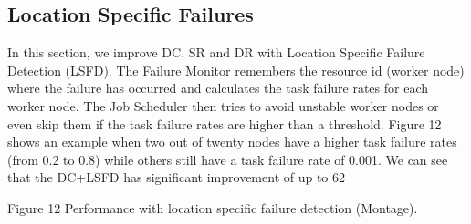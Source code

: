 \documentclass{IOS-Book-Article}
\begin{document}
\subsection{Location Specific Failures }
In this section, we improve DC, SR and DR with Location Specific Failure Detection (LSFD).  The Failure Monitor remembers the resource id (worker node) where the failure has occurred and calculates the task failure rates for each worker node. The Job Scheduler then tries to avoid unstable worker nodes or even skip them if the task failure rates are higher than a threshold. Figure 12 shows an example when two out of twenty nodes have a higher task failure rates (from 0.2 to 0.8) while others still have a task failure rate of 0.001. We can see that the DC+LSFD has significant improvement of up to 62%
 
Figure 12	Performance with location specific failure detection (Montage).   
\end{document}
